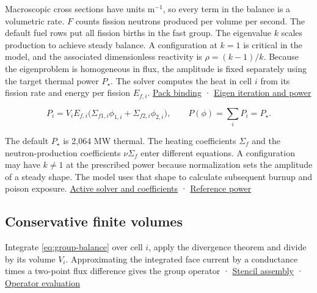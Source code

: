 \documentclass[11pt,letterpaper]{article}
\begin{document}
Macroscopic cross sections have units m\(^{-1}\), so every term in the balance is a
volumetric rate. \(F\) counts fission neutrons produced per volume per second. The
default fuel rows put all fission births in the fast group. The eigenvalue \(k\) scales
production to achieve steady balance. A configuration at \(k=1\) is critical in the
model, and the associated dimensionless reactivity is \(\rho=(k-1)/k\). Because the
eigenproblem is homogeneous in flux, the amplitude is fixed separately using the target
thermal power \(P_\star\). The solver computes the heat in cell \(i\) from its fission
rate and energy per fission \(E_{f,i}\).
\href{https://github.com/hkkho/CRS/blob/4341ae8881f5827988c3d8b1859aa9e8f13cd8a6/src/ReactorSim.Core/Domain/FullCoreDiffusionModelContracts.cs\#L1480}{Pack
binding} ·
\href{https://github.com/hkkho/CRS/blob/4341ae8881f5827988c3d8b1859aa9e8f13cd8a6/src/ReactorSim.Core/Domain/SpatialEigenIterationContracts.cs\#L831}{Eigen
iteration and power}

\begin{equation}
\label{eq:thermal-power}
P_i=V_iE_{f,i}\big(\Sigma_{f1,i}\phi_{1,i}+\Sigma_{f2,i}\phi_{2,i}\big),
\qquad P(\phi)=\sum_i P_i=P_\star .
\end{equation}

The default \(P_\star\) is 2,064 MW thermal. The heating coefficients \(\Sigma_f\) and
the neutron-production coefficients \(\nu\Sigma_f\) enter different equations. A
configuration may have \(k\ne 1\) at the prescribed power because normalization sets the
amplitude of a steady shape. The model uses that shape to calculate subsequent burnup
and poison exposure.
\href{https://github.com/hkkho/CRS/blob/4341ae8881f5827988c3d8b1859aa9e8f13cd8a6/docs/physics/active-two-group-solver.md}{Active
solver and coefficients} ·
\href{https://github.com/hkkho/CRS/blob/4341ae8881f5827988c3d8b1859aa9e8f13cd8a6/docs/physics/channel-power-reference.md}{Reference
power}

\subsection{Conservative finite volumes}\label{conservative-finite-volumes}

Integrate \eqref{eq:group-balance} over cell \(i\), apply the divergence theorem and
divide by its volume \(V_i\). Approximating the integrated face current by a conductance
times a two-point flux difference gives the group operator \cite{ref-3} ·
\href{https://github.com/hkkho/CRS/blob/4341ae8881f5827988c3d8b1859aa9e8f13cd8a6/src/ReactorSim.Core/Domain/SpatialStencilContracts.cs\#L116}{Stencil
assembly} ·
\href{https://github.com/hkkho/CRS/blob/4341ae8881f5827988c3d8b1859aa9e8f13cd8a6/src/ReactorSim.Core/Domain/SpatialOperatorContracts.cs\#L1213}{Operator
evaluation}
\end{document}
